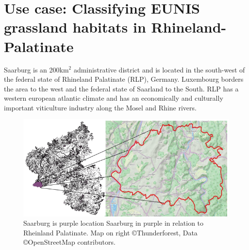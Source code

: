 \documentclass[authoryear, review,12pt,number]{elsarticle}
\begin{document}
\section{Use case: Classifying EUNIS grassland habitats in
Rhineland-Palatinate}
\label{subsec_data_study_area}
Saarburg is an 200km$^{2}$ administrative district and is located in the
south-west of the federal state of Rhineland Palatinate (RLP), Germany.
Luxembourg borders the area to the west and the federal state of Saarland to
the South. RLP has a western european atlantic climate and has an economically
and culturally important viticulture industry along the Mosel and Rhine rivers.
\begin{figure}
\label{fig_study_area}
    \includegraphics[width=\textwidth]{diagrams/study_area_closeup.png}
    \caption{Saarburg is purple location Saarburg in purple in relation to
    Rheinland Palatinate. Map on right \copyright Thunderforest, Data
\copyright OpenStreetMap contributors.}
\end{figure}
\end{document}
